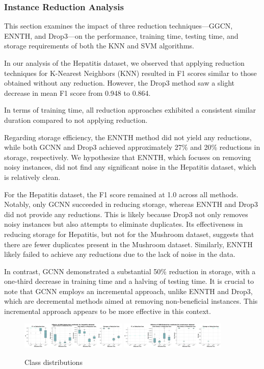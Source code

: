 \subsubsection{Instance Reduction Analysis}
\label{subsubsec:discussion-reduction}

This section examines the impact of three reduction techniques—GGCN, ENNTH, and Drop3—on the performance, training time, testing time, and storage requirements of both the KNN and SVM algorithms.



In our analysis of the Hepatitis dataset, we observed that applying reduction techniques for K-Nearest Neighbors (KNN) resulted in F1 scores similar to those obtained without any reduction. However, the Drop3 method saw a slight decrease in mean F1 score from 0.948 to 0.864. 

In terms of training time, all reduction approaches exhibited a consistent similar duration compared to not applying reduction.

Regarding storage efficiency, the ENNTH method did not yield any reductions, while both GCNN and Drop3 achieved approximately 27\% and 20\% reductions in storage, respectively. We hypothesize that ENNTH, which focuses on removing noisy instances, did not find any significant noise in the Hepatitis dataset, which is relatively clean.

For the Hepatitis dataset, the F1 score remained at 1.0 across all methods. Notably, only GCNN succeeded in reducing storage, whereas ENNTH and Drop3 did not provide any reductions. This is likely because Drop3 not only removes noisy instances but also attempts to eliminate duplicates. Its effectiveness in reducing storage for Hepatitis, but not for the Mushroom dataset, suggests that there are fewer duplicates present in the Mushroom dataset. Similarly, ENNTH likely failed to achieve any reductions due to the lack of noise in the data.

In contrast, GCNN demonstrated a substantial 50\% reduction in storage, with a one-third decrease in training time and a halving of testing time. It is crucial to note that GCNN employs an incremental approach, unlike ENNTH and Drop3, which are decremental methods aimed at removing non-beneficial instances. This incremental approach appears to be more effective in this context.

\begin{figure}
    \centering
    \includegraphics[width=0.45\textwidth]{figures/KNN_reduction_effects_hepatitis.png}
    \includegraphics[width=0.45\textwidth]{figures/KNN_reduction_effects_mushroom.png}
    \caption{Class distributions}
    \label{fig:KNN-reduction-effects}
\end{figure}

